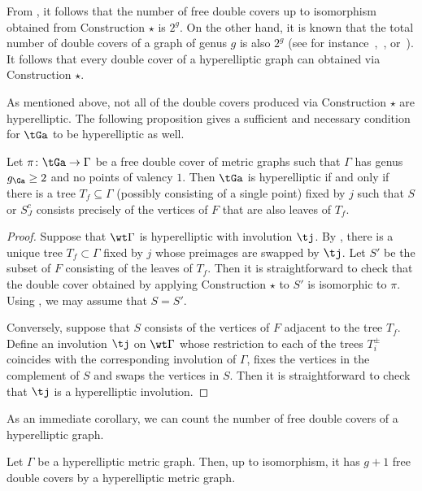 {\begin{rema}
     From ,  it follows that the number of  free double covers up to isomorphism obtained from Construction $\star$ is $2^g$. On the other hand, it is known that the total number of double covers of a graph of genus $g$ is also $2^g$ (see for instance~\cite[Construction A,B]{LZ22},~\cite[Section 5]{JensenLen_thetachars}, or~\cite{Waller_DoubleCoversOfGraphs}). It follows that every double cover of a hyperelliptic graph can obtained via  Construction $\star$.
\end{rema}

As mentioned above, not all of the double covers produced via Construction $\star$  are hyperelliptic. 
The following proposition gives a sufficient and necessary condition for $\tGa$ to be hyperelliptic as well. 

\begin{prop}\label{constrhypcovers}
     Let $\pi\colon \tGa\to \Gamma$ be a free double cover of metric graphs such that $\Gamma$ has  genus $g_{\Ga}\geq 2$ and no points of valency $1$. 
Then $\tGa$ is hyperelliptic if and only if there is a tree $T_f\subseteq\Gamma$ (possibly consisting of a single point) fixed by $j$ such that $S$ or $S^c_J$ consists precisely of the vertices of $F$ that are also leaves of $T_f$. 
\end{prop}

     \begin{proof} 
Suppose that $\wt\Gamma$ is hyperelliptic with involution $\tj$. By   , there is a unique tree $T_f\subset\Gamma$ fixed by $j$ whose preimages are swapped by $\tj$. Let   $S'$ be the subset of $F$ consisting  of the leaves of $T_f$. Then it is straightforward to check that  
the double cover obtained by applying Construction $\star$ to $S'$ is isomorphic to $\pi$. Using , we may assume that $S=S'$. 

Conversely, suppose that $S$ consists of the vertices of $F$ adjacent to the tree $T_f$. Define an involution $\tj$ on $\wt\Gamma$ whose restriction to each of the trees $T_i^{\pm}$ coincides with the corresponding involution of $\Gamma$, fixes the vertices in the complement of $S$ and swaps the vertices in $S$. Then it is straightforward to check that $\tj$ is a hyperelliptic involution. 
     \end{proof}


As an immediate corollary, we can count the number of free double covers of a hyperelliptic graph. 

\begin{coro}\label{cor:numberOfHyperelliptic}
   Let $\Gamma$ be a hyperelliptic metric graph. Then, up to isomorphism, it has $g+1$ free double covers by a hyperelliptic metric graph.
\end{coro}
}

